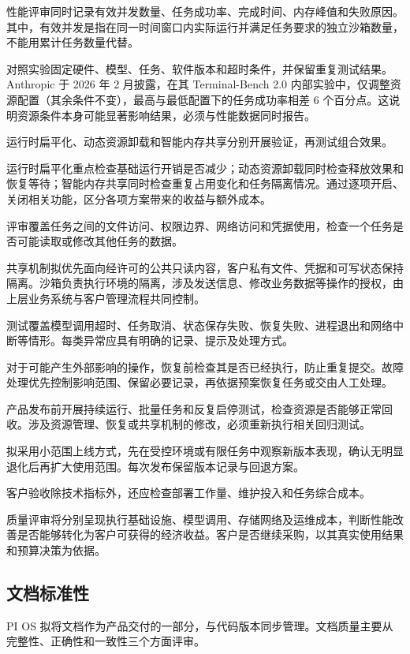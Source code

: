 性能评审同时记录有效并发数量、任务成功率、完成时间、内存峰值和失败原因。其中，有效并发是指在同一时间窗口内实际运行并满足任务要求的独立沙箱数量，不能用累计任务数量代替。

对照实验固定硬件、模型、任务、软件版本和超时条件，并保留重复测试结果。Anthropic 于 2026 年 2 月披露，在其 Terminal-Bench 2.0 内部实验中，仅调整资源配置（其余条件不变），最高与最低配置下的任务成功率相差 6 个百分点。这说明资源条件本身可能显著影响结果，必须与性能数据同时报告。

运行时扁平化、动态资源卸载和智能内存共享分别开展验证，再测试组合效果。

运行时扁平化重点检查基础运行开销是否减少；动态资源卸载同时检查释放效果和恢复等待；智能内存共享同时检查重复占用变化和任务隔离情况。通过逐项开启、关闭相关功能，区分各项方案带来的收益与额外成本。

评审覆盖任务之间的文件访问、权限边界、网络访问和凭据使用，检查一个任务是否可能读取或修改其他任务的数据。

共享机制拟优先面向经许可的公共只读内容，客户私有文件、凭据和可写状态保持隔离。沙箱负责执行环境的隔离，涉及发送信息、修改业务数据等操作的授权，由上层业务系统与客户管理流程共同控制。

测试覆盖模型调用超时、任务取消、状态保存失败、恢复失败、进程退出和网络中断等情形。每类异常应具有明确的记录、提示及处理方式。

对于可能产生外部影响的操作，恢复前检查其是否已经执行，防止重复提交。故障处理优先控制影响范围、保留必要记录，再依据预案恢复任务或交由人工处理。

产品发布前开展持续运行、批量任务和反复启停测试，检查资源是否能够正常回收。涉及资源管理、恢复或共享机制的修改，必须重新执行相关回归测试。

拟采用小范围上线方式，先在受控环境或有限任务中观察新版本表现，确认无明显退化后再扩大使用范围。每次发布保留版本记录与回退方案。

客户验收除技术指标外，还应检查部署工作量、维护投入和任务综合成本。

质量评审将分别呈现执行基础设施、模型调用、存储网络及运维成本，判断性能改善是否能够转化为客户可获得的经济收益。客户是否继续采购，以其真实使用结果和预算决策为依据。

\subsection{文档标准性}\label{sec:5.1.2}
PI OS 拟将文档作为产品交付的一部分，与代码版本同步管理。文档质量主要从完整性、正确性和一致性三个方面评审。


